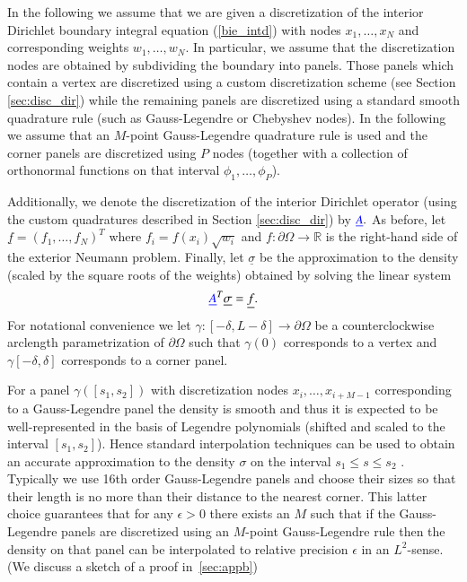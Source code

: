 In the following we assume that we are given a discretization of the interior Dirichlet boundary integral equation (\ref{bie_intd}) with nodes $x_1,\dots,x_N$ and corresponding weights $w_1,\dots,w_N.$ In particular, we assume that the discretization nodes are obtained by subdividing the boundary into panels. Those panels which contain a vertex are discretized using a custom discretization scheme (see Section \ref{sec:disc_dir}) while the remaining panels are discretized using a standard smooth quadrature rule (such as Gauss-Legendre or Chebyshev nodes). In the following we assume that an $M$-point Gauss-Legendre quadrature rule is used and the corner panels are discretized using $P$ nodes (together with a collection of orthonormal functions on that interval $\phi_1,\dots,\phi_P$).

Additionally, we denote the discretization of the interior Dirichlet operator (using the custom quadratures described in Section \ref{sec:disc_dir}) by ${\color{blue} \underline{A}}.$ As before, let $\underline{f} = (f_1,\dots,f_N)^T$ where $f_i = f(x_i) \sqrt{w_i}$ and $f: \partial \Omega \to \mathbb{R}$ is the right-hand side of the exterior Neumann problem. Finally, let $\underline{\sigma}$ be the approximation to the density (scaled by the square roots of the weights) obtained by solving the linear system
\begin{align}\label{eqn:adj_linalg}
{\color{blue} \underline{A}}^T \underline{\sigma} = \underline{f}.
\end{align}
For notational convenience we let $\gamma:[-\delta,L-\delta] \to \partial \Omega$ be a counterclockwise arclength parametrization of $\partial \Omega$ such that  $\gamma(0)$ corresponds to a vertex and $\gamma[-\delta,\delta]$ corresponds to a corner panel.

For a panel $\gamma([s_1,s_2])$ with discretization nodes {\color{blue}$x_i,\dots,x_{i+M-1}$} corresponding to a Gauss-Legendre panel the density is smooth and thus it is expected to be well-represented in the basis of Legendre polynomials (shifted and scaled to the interval $[s_1,s_2]$). Hence standard interpolation techniques can be used to obtain an accurate approximation to the density $\sigma$ on the interval $s_1 \le s\le s_2$ . Typically we use 16th order Gauss-Legendre panels and choose their sizes so that their length is no more than their distance to the nearest corner. This latter choice guarantees that for any $\epsilon>0$ there exists an $M$ such that if the Gauss-Legendre panels are discretized using an $M$-point Gauss-Legendre rule then the density on that panel can be interpolated to relative precision $\epsilon$ in an $L^2$-sense.
(We discuss a sketch of a proof in~\cref{sec:appb})


